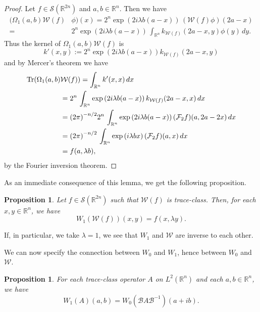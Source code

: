 \documentclass[12pt]{amsart}
\numberwithin{equation}{section}
\newtheorem{proposition}[theorem]{Proposition}
\begin{document}
\begin{proof} Let $f\in {\mathcal S}({\mathbb
R}^{2n})$ and $a, b \in {\mathbb R}^{n}$. Then we have
\begin{align*} (\Omega_1(a,b){\mathcal W}(f)&\phi)(x)=
2^n\exp \left(2i{\lambda}b(a-x)\right)\,({\mathcal W}(f)\phi)(2a-x)\\
=&2^n\exp \left(2i{\lambda}b(a-x)\right)\,\int_{ {\mathbb R}^{n}}k_{{\mathcal W}(f)}(2a-x,y)\phi(y)\,dy.
\end{align*}
Thus the kernel of $\Omega_1(a,b){\mathcal W}(f)$ is 
\begin{equation*}k'(x,y):=2^n\exp \left(2i{\lambda}b(a-x)\right)k_{{\mathcal W}(f)}(2a-x,y)\end{equation*} and by Mercer's theorem we have
\begin{align*}\operatorname{Tr}(\Omega_1(a,b)&{\mathcal W}(f))=\int_{ {\mathbb R}^{n}}k'(x,x)\,dx\\
&=2^n\,\int_{ {\mathbb R}^{n}}\exp \left(2i{\lambda}b(a-x)\right)k_{{\mathcal W}(f)}
(2a-x,x)\,dx\\
&={(2\pi)}^{-n/2}2^n\,\int_{ {\mathbb R}^{n}}\exp \left(2i{\lambda}b(a-x)\right)({\mathcal F}_2f)(a,2a-2x)\,dx\\
&={(2\pi)}^{-n/2}\,\int_{ {\mathbb R}^{n}}\exp \left(i{\lambda}bx\right)({\mathcal F}_2f)(a,x)\,dx\\
&=f(a,\lambda b),
\end{align*}
by the Fourier inversion theorem.
\end{proof}

As an immediate consequence of this lemma, we get the following proposition.
\begin{proposition} Let $f\in {\mathcal S}({\mathbb R}^{2n})$ such that ${\mathcal W}(f)$
is trace-class. Then, for each $x,y \in {\mathbb R}^n$, we have
\begin{equation*}W_1({\mathcal W}(f))(x,y)=f(x,\lambda y).
\end{equation*}
\end{proposition}
If, in particular,  we take $\lambda =1$, we see that $W_1$ and $\mathcal W$ are inverse
to each other. 

We can now specify the connection between $W_0$ and $W_1$, hence between $W_0$ and $\mathcal W$.
\begin{proposition} \label{propconnect} For each trace-class operator $A$ on $L^2({\mathbb R}^{n})$ and each
$a, b\in {\mathbb R}^{n}$, we have
\begin{equation*}W_1(A)(a,b)=W_0({\mathcal B}A{\mathcal B}^{-1})(a+ib).\end{equation*}
\end{proposition}
\end{document}
